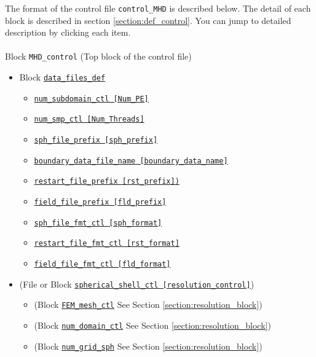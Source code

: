 The format of the control file \verb|control_MHD| is described below. The detail of each block is described in section \ref{section:def_control}. You can jump to detailed description by clicking each item. \\
\\
%
Block \verb|MHD_control|  (Top block of the control file)
\label{href_i:MHD_control}
%
\begin{itemize}
\item Block \hyperref[href_t:data_files_def]{\tt data\_files\_def}
	\label{href_i:data_files_def}
%
	\begin{itemize}
	\item \hyperref[href_t:num_subdomain_ctl]
			{\tt num\_subdomain\_ctl    [Num\_PE]}
	\item \hyperref[href_t:num_smp_ctl]
			{\tt num\_smp\_ctl    [Num\_Threads]}
	\item \hyperref[href_t:sph_file_prefix]
			{\tt sph\_file\_prefix    [sph\_prefix]}
	\item \hyperref[href_t:boundary_data_file_name]
		{\tt boundary\_data\_file\_name    [boundary\_data\_name]}
%
	\item \hyperref[href_t:restart_file_prefix]
		{\tt restart\_file\_prefix    [rst\_prefix])}
	\item \hyperref[href_t:field_file_prefix]
			{\tt field\_file\_prefix    [fld\_prefix]}
%
	\item \hyperref[href_t:sph_file_fmt_ctl]
			{\tt sph\_file\_fmt\_ctl    [sph\_format]}
	\item \hyperref[href_t:restart_file_fmt_ctl]
			{\tt restart\_file\_fmt\_ctl    [rst\_format]}
	\item \hyperref[href_t:field_file_fmt_ctl]
			{\tt field\_file\_fmt\_ctl    [fld\_format]}
	\end{itemize}
%
\item (File or Block \hyperref[href_i:spherical_shell_ctl]
			{\tt spherical\_shell\_ctl        [resolution\_control]})
	\begin{itemize}
	\item (Block \hyperref[href_i:FEM_mesh_ctl]
        {\tt FEM\_mesh\_ctl} See Section \ref{section:resolution_block})
	\item (Block \hyperref[href_i:num_domain_ctl]
		{\tt num\_domain\_ctl} See Section \ref{section:resolution_block})
	\item (Block \hyperref[href_i:num_grid_sph]
		{\tt num\_grid\_sph} See Section \ref{section:resolution_block})
	\end{itemize}

\end{itemize}
